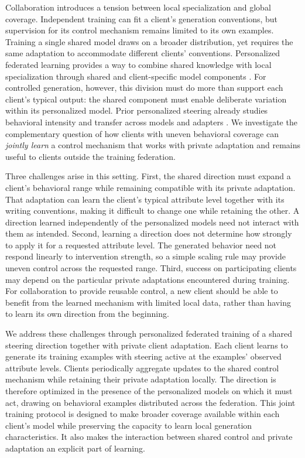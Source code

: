 \documentclass[11pt]{article}
\begin{document}
Collaboration introduces a tension between local specialization and global coverage.
Independent training can fit a client's generation conventions, but supervision for its control mechanism remains limited to its own examples.
Training a single shared model draws on a broader distribution, yet requires the same adaptation to accommodate different clients' conventions.
Personalized federated learning provides a way to combine shared knowledge with local specialization through shared and client-specific model components \citep{collins-etal-2021-fedrep,guo-etal-2025-fedsa}.
For controlled generation, however, this division must do more than support each client's typical output: the shared component must enable deliberate variation within its personalized model.
Prior personalized steering already studies behavioral intensity and transfer across models and adapters \citep{cao-etal-2024-bipo}.
We investigate the complementary question of how clients with uneven behavioral coverage can \emph{jointly learn} a control mechanism that works with private adaptation and remains useful to clients outside the training federation.

Three challenges arise in this setting.
First, the shared direction must expand a client's behavioral range while remaining compatible with its private adaptation.
That adaptation can learn the client's typical attribute level together with its writing conventions, making it difficult to change one while retaining the other.
A direction learned independently of the personalized models need not interact with them as intended.
Second, learning a direction does not determine how strongly to apply it for a requested attribute level.
The generated behavior need not respond linearly to intervention strength, so a simple scaling rule may provide uneven control across the requested range.
Third, success on participating clients may depend on the particular private adaptations encountered during training.
For collaboration to provide reusable control, a new client should be able to benefit from the learned mechanism with limited local data, rather than having to learn its own direction from the beginning.

We address these challenges through personalized federated training of a shared steering direction together with private client adaptation.
Each client learns to generate its training examples with steering active at the examples' observed attribute levels.
Clients periodically aggregate updates to the shared control mechanism while retaining their private adaptation locally.
The direction is therefore optimized in the presence of the personalized models on which it must act, drawing on behavioral examples distributed across the federation.
This joint training protocol is designed to make broader coverage available within each client's model while preserving the capacity to learn local generation characteristics.
It also makes the interaction between shared control and private adaptation an explicit part of learning.
\end{document}
